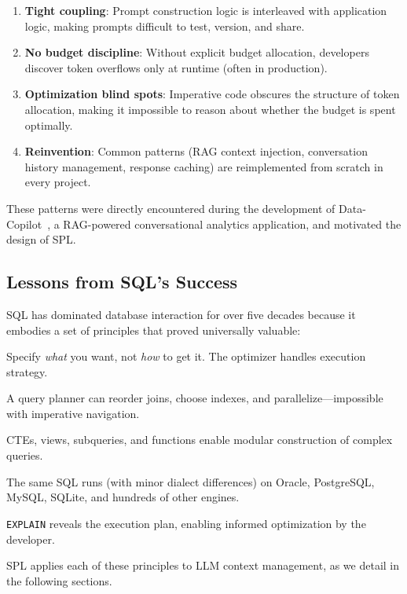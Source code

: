 \documentclass[11pt,a4paper]{article}
\begin{document}
\begin{enumerate}[nosep]
  \item \textbf{Tight coupling}: Prompt construction logic is interleaved with application logic, making prompts difficult to test, version, and share.
  \item \textbf{No budget discipline}: Without explicit budget allocation, developers discover token overflows only at runtime (often in production).
  \item \textbf{Optimization blind spots}: Imperative code obscures the structure of token allocation, making it impossible to reason about whether the budget is spent optimally.
  \item \textbf{Reinvention}: Common patterns (RAG context injection, conversation history management, response caching) are reimplemented from scratch in every project.
\end{enumerate}

These patterns were directly encountered during the development of
Data-Copilot~\citep{gong2024datacopilot}, a RAG-powered conversational analytics
application, and motivated the design of SPL.

\subsection{Lessons from SQL's Success}

SQL has dominated database interaction for over five decades because it embodies a set of principles that proved universally valuable:

\begin{description}[nosep]
  \item[Declarative] Specify \emph{what} you want, not \emph{how} to get it. The optimizer handles execution strategy.
  \item[Optimizable] A query planner can reorder joins, choose indexes, and parallelize---impossible with imperative navigation.
  \item[Composable] CTEs, views, subqueries, and functions enable modular construction of complex queries.
  \item[Portable] The same SQL runs (with minor dialect differences) on Oracle, PostgreSQL, MySQL, SQLite, and hundreds of other engines.
  \item[Transparent] \texttt{EXPLAIN} reveals the execution plan, enabling informed optimization by the developer.
\end{description}

SPL applies each of these principles to LLM context management, as we detail in the following sections.
\end{document}
